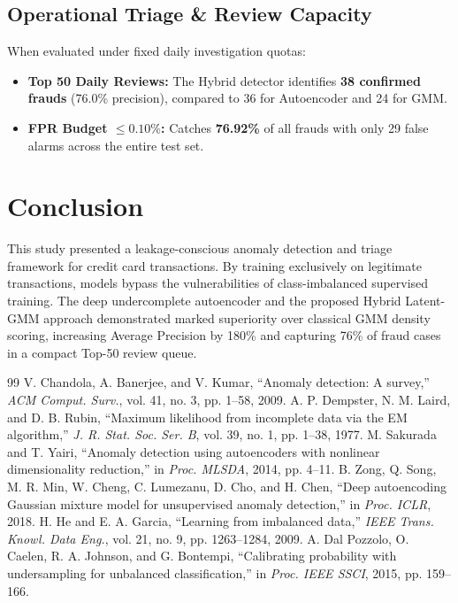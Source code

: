 \documentclass[conference]{IEEEtran}
\begin{document}
\subsection{Operational Triage & Review Capacity}
When evaluated under fixed daily investigation quotas:
\begin{itemize}
    \item \textbf{Top 50 Daily Reviews:} The Hybrid detector identifies \textbf{38 confirmed frauds} (76.0\% precision), compared to 36 for Autoencoder and 24 for GMM.
    \item \textbf{FPR Budget $\le 0.10\%$:} Catches \textbf{76.92\%} of all frauds with only 29 false alarms across the entire test set.
\end{itemize}

\section{Conclusion}
This study presented a leakage-conscious anomaly detection and triage framework for credit card transactions. By training exclusively on legitimate transactions, models bypass the vulnerabilities of class-imbalanced supervised training. The deep undercomplete autoencoder and the proposed Hybrid Latent-GMM approach demonstrated marked superiority over classical GMM density scoring, increasing Average Precision by 180\% and capturing 76\% of fraud cases in a compact Top-50 review queue.

\balance
\begin{thebibliography}{99}
 V. Chandola, A. Banerjee, and V. Kumar, ``Anomaly detection: A survey,'' \emph{ACM Comput. Surv.}, vol. 41, no. 3, pp. 1--58, 2009.
 A. P. Dempster, N. M. Laird, and D. B. Rubin, ``Maximum likelihood from incomplete data via the EM algorithm,'' \emph{J. R. Stat. Soc. Ser. B}, vol. 39, no. 1, pp. 1--38, 1977.
 M. Sakurada and T. Yairi, ``Anomaly detection using autoencoders with nonlinear dimensionality reduction,'' in \emph{Proc. MLSDA}, 2014, pp. 4--11.
 B. Zong, Q. Song, M. R. Min, W. Cheng, C. Lumezanu, D. Cho, and H. Chen, ``Deep autoencoding Gaussian mixture model for unsupervised anomaly detection,'' in \emph{Proc. ICLR}, 2018.
 H. He and E. A. Garcia, ``Learning from imbalanced data,'' \emph{IEEE Trans. Knowl. Data Eng.}, vol. 21, no. 9, pp. 1263--1284, 2009.
 A. Dal Pozzolo, O. Caelen, R. A. Johnson, and G. Bontempi, ``Calibrating probability with undersampling for unbalanced classification,'' in \emph{Proc. IEEE SSCI}, 2015, pp. 159--166.
\end{thebibliography}
\end{document}
